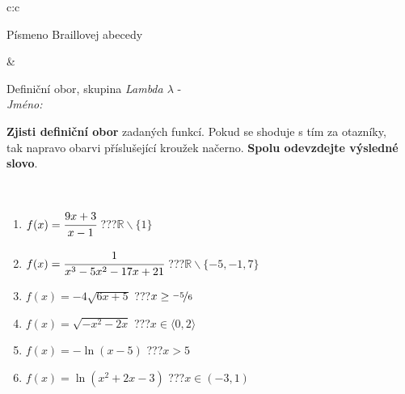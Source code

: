 \documentclass[10pt]{report}
\begin{document}
\begin{tabular}{c:c}
\begin{minipage}[c][104.5mm][t]{0.5\linewidth}
\begin{center}
\begin{minipage}{0.20\linewidth}
\begin{center}
{\small Písmeno Braillovej abecedy}
\end{center}
\end{minipage}
\end{center}
\end{minipage}
&
\begin{minipage}[c][104.5mm][t]{0.5\linewidth}
\begin{center}
\vspace{7mm}
{\huge Definiční obor, skupina \textit{Lambda $\lambda$} -}\\[5mm]
\textit{Jméno:}\phantom{xxxxxxxxxxxxxxxxxxxxxxxxxxxxxxxxxxxxxxxxxxxxxxxxxxxxxxxxxxxxxxxxx}\\[5mm]
\begin{minipage}{0.95\linewidth}
\begin{center}
\textbf{Zjisti definiční obor} zadaných funkcí. Pokud se shoduje s tím za otazníky,\\tak napravo obarvi příslušející kroužek načerno. \textbf{Spolu odevzdejte výsledné slovo}.
\end{center}
\end{minipage}
\\[1mm]
\begin{minipage}{0.79\linewidth}
\begin{center}
\begin{varwidth}{\linewidth}
\begin{enumerate}
\normalsizerrr
\item $f(x)=\cfrac{9x+3}{x-1}$\quad \dotfill\; ???\;\dotfill \quad $\mathbb{R}\smallsetminus\{1\}$
\item $f(x)=\cfrac{1}{x^3-5x^2-17x+21}$\quad \dotfill\; ???\;\dotfill \quad $\mathbb{R}\smallsetminus\{-5,-1,7\}$
\item $f(x)=-4\sqrt{6x+5}$\quad \dotfill\; ???\;\dotfill \quad $x\geq\nicefrac{-5}{6}$
\item $f(x)=\sqrt{-x^2-2x}$\quad \dotfill\; ???\;\dotfill \quad $x\in\langle0 , 2\rangle$
\item $f(x)=-\ln{(x-5)}$\quad \dotfill\; ???\;\dotfill \quad $x>5$
\item $f(x)=\ln{(x^2+2x-3)}$\quad \dotfill\; ???\;\dotfill \quad $x\in(-3 , 1)$
\end{enumerate}
\end{varwidth}
\end{center}
\end{minipage}
\begin{minipage}{0.20\linewidth}
\begin{center}

\end{center}
\end{minipage}
\end{center}
\end{minipage}
\end{tabular}
\end{document}
